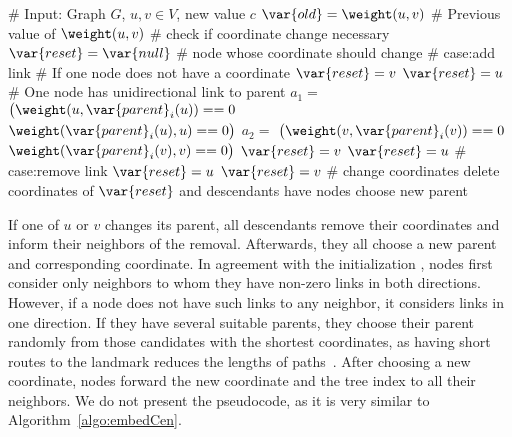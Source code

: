 \begin{algorithm}[t]
\caption{$\setC$}
\label{algo:setC}
\begin{algorithmic}[1]
\STATE \# Input: Graph $G$, $u,v \in V$, new value $c$
\STATE $\var{old} = \weight(u,v)$ \# Previous value of $\weight(u,v)$
\STATE \# check if coordinate change necessary 
\STATE $\var{reset}=\var{null}$ \# node whose coordinate should change 
\STATE \# case:add link
\STATE \# If one node does not have a coordinate \label{algo:unsetSt}
\STATE $\var{reset}=v$
\ENDIF 
{}
\STATE $\var{reset}=u$
\ENDIF \label{algo:unsetEnd}
\STATE \# One node has unidirectional link to parent \label{algo:uniSt}
\STATE $a_1=$ $\big(\weight(u, \var{parent}_i(u))==0$ \OR\\ \hspace{2.5em} $\weight(\var{parent}_i(u),u)==0\big)$
\STATE $a_2=$ $\big(\weight(v, \var{parent}_i(v))==0$ \OR\\ \hspace{2.5em} $\weight(\var{parent}_i(v),v)==0\big)$
\STATE $\var{reset}=v$
\ENDIF
{}
\STATE $\var{reset}=u$
\ENDIF
\ENDIF
\ENDIF \label{algo:uniEnd}
\ENDIF
\STATE \# case:remove link
 \label{algo:rmSt}
\STATE $\var{reset}=u$
\ENDIF
{} 
\STATE $\var{reset}=v$
\ENDIF \label{algo:rmEnd}
\ENDIF
\STATE \# change coordinates
\STATE delete coordinates of $\var{reset}$ and descendants
\STATE have nodes choose new parent
\ENDIF 
\ENDFOR
\end{algorithmic}
\end{algorithm}

If one of $u$ or $v$ changes its parent, all descendants remove their coordinates and inform their neighbors of the removal. 
Afterwards, they all choose a new parent and corresponding coordinate. In agreement with the initialization \setRoute , nodes first consider only neighbors to whom they have non-zero links in both directions. However, if a node does not have such links to any neighbor, it considers links in one direction. If they have several suitable parents, they choose their parent randomly from those candidates with the shortest coordinates, as having short routes to the landmark reduces the lengths of paths~\cite{roos2016anonymous}. 
After choosing a new coordinate, nodes forward the new coordinate and the tree index to all their neighbors. We do not present the pseudocode, as it is very similar to Algorithm~\ref{algo:embedCen}.

